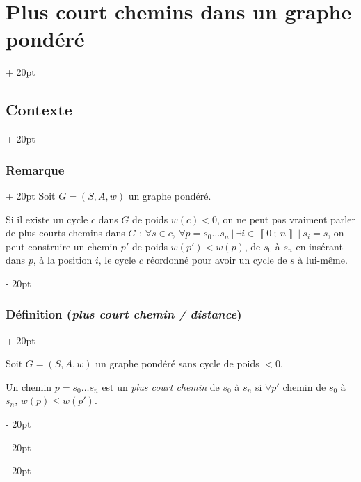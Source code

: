 \documentclass[a4paper, 12pt, twoside]{article}
\newcommand{\nset}[2]{\left\llbracket #1\ ;\ #2 \right\rrbracket}
\renewcommand{\le}{\leqslant}
\newcommand{\ind}[1][20pt]{\advance\leftskip + #1}
\newcommand{\deind}[1][20pt]{\advance\leftskip - #1}
\newenvironment{indt}[2][20pt]{#2 \par \ind[#1]}{\par \deind} %
\begin{document}
\begin{indt}{\section{Plus court chemins dans un graphe pondéré}}
\begin{indt}{\subsection{Contexte}}
            \vspace{12pt}
            
            \begin{indt}{\subsubsection{Remarque}}
                Soit $G = (S, A, w)$ un graphe pondéré.

                Si il existe un cycle $c$ dans $G$ de poids $w(c) < 0$, on ne peut pas vraiment parler de plus courts chemins dans $G$ :
                $\forall s \in c,\ \forall p = s_0 \ldots s_n\ |\ \exists i \in \nset 0 n\ |\ s_i = s$, on peut construire un chemin $p'$ de poids $w(p') < w(p)$, de $s_0$ à $s_n$ en insérant dans $p$, à la position $i$, le cycle $c$ réordonné pour avoir un cycle de $s$ à lui-même.

                \begin{center}
                \end{center}
            \end{indt}

            \vspace{12pt}
            
            \begin{indt}{\subsubsection{Définition (\textit{plus court chemin / distance})}}
                \label{5.1.4}

                Soit $G = (S, A, w)$ un graphe pondéré sans cycle de poids $< 0$.

                Un chemin $p = s_0 \ldots s_n$ est un \textit{plus court chemin} de $s_0$ à $s_n$ si $\forall p'$ chemin de $s_0$ à $s_n$, $w(p) \le w(p')$.

                \vspace{12pt}
                

\end{indt}
\end{indt}
\end{indt}
\end{document}
